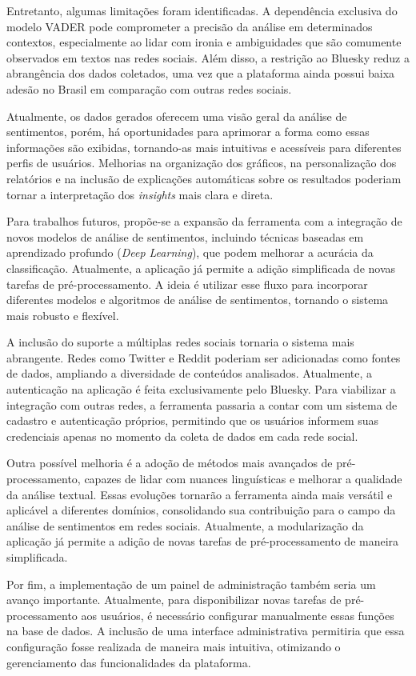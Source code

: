 \documentclass[
	12pt,				%
	oneside,			%
	a4paper,			%
	english,			%
	french,				%
	spanish,			%
	brazil				%
	]{abntex2}
\begin{document}
Entretanto, algumas limitações foram identificadas. A dependência
exclusiva do modelo VADER pode comprometer a precisão da análise em
determinados contextos, especialmente ao lidar com ironia e ambiguidades
que são comumente observados em textos nas redes sociais. Além disso, a
restrição ao Bluesky reduz a abrangência dos dados coletados, uma vez
que a plataforma ainda possui baixa adesão no Brasil em comparação com
outras redes sociais.

Atualmente, os dados gerados oferecem uma visão geral da análise de
sentimentos, porém, há oportunidades para aprimorar a forma como essas
informações são exibidas, tornando-as mais intuitivas e acessíveis para
diferentes perfis de usuários. Melhorias na organização dos gráficos, na
personalização dos relatórios e na inclusão de explicações automáticas
sobre os resultados poderiam tornar a interpretação dos \emph{insights}
mais clara e direta.

Para trabalhos futuros, propõe-se a expansão da ferramenta com a
integração de novos modelos de análise de sentimentos, incluindo
técnicas baseadas em aprendizado profundo (\emph{Deep Learning}), que
podem melhorar a acurácia da classificação. Atualmente, a aplicação já
permite a adição simplificada de novas tarefas de pré-processamento. A
ideia é utilizar esse fluxo para incorporar diferentes modelos e
algoritmos de análise de sentimentos, tornando o sistema mais robusto e
flexível.

A inclusão do suporte a múltiplas redes sociais tornaria o sistema mais
abrangente. Redes como Twitter e Reddit poderiam ser adicionadas como
fontes de dados, ampliando a diversidade de conteúdos analisados.
Atualmente, a autenticação na aplicação é feita exclusivamente pelo
Bluesky. Para viabilizar a integração com outras redes, a ferramenta
passaria a contar com um sistema de cadastro e autenticação próprios,
permitindo que os usuários informem suas credenciais apenas no momento
da coleta de dados em cada rede social.

Outra possível melhoria é a adoção de métodos mais avançados de
pré-processamento, capazes de lidar com nuances linguísticas e melhorar
a qualidade da análise textual. Essas evoluções tornarão a ferramenta
ainda mais versátil e aplicável a diferentes domínios, consolidando sua
contribuição para o campo da análise de sentimentos em redes sociais.
Atualmente, a modularização da aplicação já permite a adição de novas
tarefas de pré-processamento de maneira simplificada.

Por fim, a implementação de um painel de administração também seria um
avanço importante. Atualmente, para disponibilizar novas tarefas de
pré-processamento aos usuários, é necessário configurar manualmente
essas funções na base de dados. A inclusão de uma interface
administrativa permitiria que essa configuração fosse realizada de
maneira mais intuitiva, otimizando o gerenciamento das funcionalidades
da plataforma.
\end{document}

